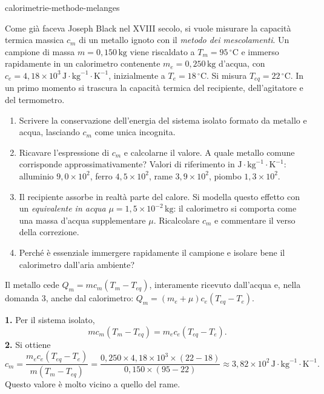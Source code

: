 \begin{exo}{calorimetrie-methode-melanges}

Come già faceva Joseph Black nel XVIII secolo, si vuole misurare la capacità termica massica $c_m$ di un metallo ignoto con il \emph{metodo dei mescolamenti}. Un campione di massa $m=0{,}150\,\text{kg}$ viene riscaldato a $T_m=95\,^\circ\text{C}$ e immerso rapidamente in un calorimetro contenente $m_e=0{,}250\,\text{kg}$ d'acqua, con $c_e=4{,}18\times10^3\,\text{J}\!\cdot\!\text{kg}^{-1}\!\cdot\!\text{K}^{-1}$, inizialmente a $T_e=18\,^\circ\text{C}$. Si misura $T_{eq}=22\,^\circ\text{C}$. In un primo momento si trascura la capacità termica del recipiente, dell'agitatore e del termometro.

\begin{enumerate}
  \item Scrivere la conservazione dell'energia del sistema isolato formato da metallo e acqua, lasciando $c_m$ come unica incognita.
  \item Ricavare l'espressione di $c_m$ e calcolarne il valore. A quale metallo comune corrisponde approssimativamente? Valori di riferimento in $\text{J}\!\cdot\!\text{kg}^{-1}\!\cdot\!\text{K}^{-1}$: alluminio $9{,}0\times10^2$, ferro $4{,}5\times10^2$, rame $3{,}9\times10^2$, piombo $1{,}3\times10^2$.
  \item Il recipiente assorbe in realtà parte del calore. Si modella questo effetto con un \emph{equivalente in acqua} $\mu=1{,}5\times10^{-2}\,\text{kg}$: il calorimetro si comporta come una massa d'acqua supplementare $\mu$. Ricalcolare $c_m$ e commentare il verso della correzione.
  \item Perché è essenziale immergere rapidamente il campione e isolare bene il calorimetro dall'aria ambiente?
\end{enumerate}

\begin{indication}
Il metallo cede $Q_m=mc_m(T_m-T_{eq})$, interamente ricevuto dall'acqua e, nella domanda 3, anche dal calorimetro: $Q_m=(m_e+\mu)c_e(T_{eq}-T_e)$.
\end{indication}

\begin{solution}
\textbf{1.} Per il sistema isolato,
\[
mc_m(T_m-T_{eq})=m_ec_e(T_{eq}-T_e).
\]
\textbf{2.} Si ottiene
\[
c_m=\frac{m_ec_e(T_{eq}-T_e)}{m(T_m-T_{eq})}
=\frac{0{,}250\times4{,}18\times10^3\times(22-18)}{0{,}150\times(95-22)}
\approx3{,}82\times10^2\,\text{J}\!\cdot\!\text{kg}^{-1}\!\cdot\!\text{K}^{-1}.
\]
Questo valore è molto vicino a quello del rame.


\end{solution}
\end{exo}
